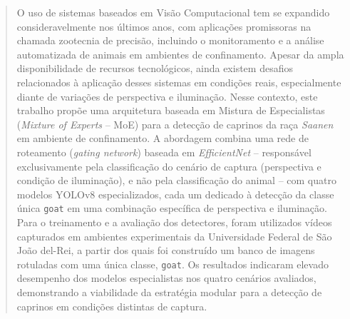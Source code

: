 \documentclass[12pt,fleqn]{article}
\begin{document}
\begin{abstract}
O uso de sistemas baseados em Visão Computacional tem se expandido consideravelmente nos últimos anos, com aplicações promissoras na chamada zootecnia de precisão, incluindo o monitoramento e a análise automatizada de animais em ambientes de confinamento. Apesar da ampla disponibilidade de recursos tecnológicos, ainda existem desafios relacionados à aplicação desses sistemas em condições reais, especialmente diante de variações de perspectiva e iluminação. Nesse contexto, este trabalho propõe uma arquitetura baseada em Mistura de Especialistas (\textit{Mixture of Experts} -- MoE) para a detecção de caprinos da raça \textit{Saanen} em ambiente de confinamento. A abordagem combina uma rede de roteamento (\textit{gating network}) baseada em \textit{EfficientNet} -- responsável exclusivamente pela classificação do cenário de captura (perspectiva e condição de iluminação), e não pela classificação do animal -- com quatro modelos YOLOv8 especializados, cada um dedicado à detecção da classe única \texttt{goat} em uma combinação específica de perspectiva e iluminação. Para o treinamento e a avaliação dos detectores, foram utilizados vídeos capturados em ambientes experimentais da Universidade Federal de São João del-Rei, a partir dos quais foi construído um banco de imagens rotuladas com uma única classe, \texttt{goat}. Os resultados indicaram elevado desempenho dos modelos especialistas nos quatro cenários avaliados, demonstrando a viabilidade da estratégia modular para a detecção de caprinos em condições distintas de captura.
\end{abstract}
\end{document}
